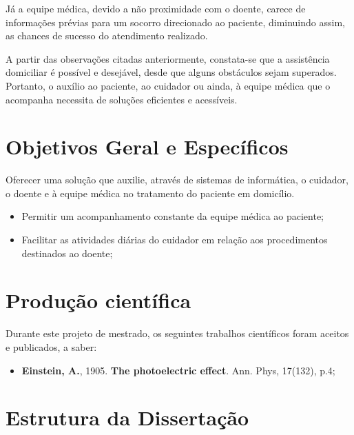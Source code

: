 Já a equipe médica, devido a não proximidade com o doente, carece de informações
prévias para um socorro direcionado ao paciente, diminuindo assim, as chances de
sucesso do atendimento realizado.


A partir das observações citadas anteriormente, constata-se que a assistência
domiciliar é possível e desejável, desde que alguns obstáculos sejam superados.
Portanto, o auxílio ao paciente, ao cuidador ou ainda, à equipe médica que o
acompanha necessita de soluções eficientes e acessíveis.

\section{Objetivos Geral e Específicos}\label{sec:objetivos}

Oferecer uma solução que auxilie, através de sistemas de informática, o 
cuidador, o doente e à equipe médica no tratamento do paciente em domicílio.


\begin{itemize}
  \item Permitir um acompanhamento constante da equipe médica ao paciente;
  \item Facilitar as atividades diárias do cuidador em relação aos procedimentos
  destinados ao doente;
\end{itemize}

\section{Produção científica}\label{sec:producao}  

Durante este projeto de mestrado, os seguintes trabalhos científicos foram
aceitos e publicados, a saber:

\begin{itemize}
	\item \textbf{Einstein, A.}, 1905. \textbf{The photoelectric effect}. Ann. Phys, 17(132), p.4;
\end{itemize}

\section{Estrutura da Dissertação}\label{sec:estrutura}
